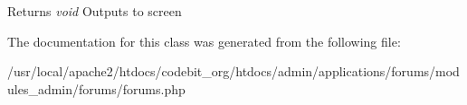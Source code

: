 \begin{DoxyReturn}{Returns}
{\itshape void} Outputs to screen 
\end{DoxyReturn}


The documentation for this class was generated from the following file\-:\begin{DoxyCompactItemize}
\item 
/usr/local/apache2/htdocs/codebit\-\_\-org/htdocs/admin/applications/forums/modules\-\_\-admin/forums/forums.\-php\end{DoxyCompactItemize}
